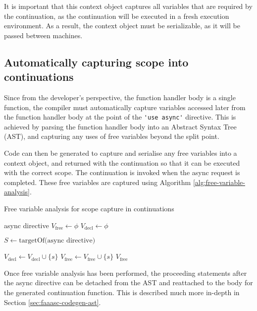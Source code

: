 It is important that this context object captures all variables that are required by the continuation, as the continuation will be executed in a fresh execution environment. As a result, the context object must be serializable, as it will be passed between machines.

\subsection{Automatically capturing scope into continuations}
Since from the developer's perspective, the function handler body is a single function, the \faaasc{} compiler must automatically capture variables accessed later from the function handler body at the point of the \verb|'use async'| directive. This is achieved by parsing the function handler body into an Abstract Syntax Tree (AST), and capturing any uses of free variables beyond the split point.

Code can then be generated to capture and serialise any free variables into a context object, and returned with the continuation so that it can be executed with the correct scope. The continuation is invoked when the async request is completed. These free variables are captured using Algorithm \ref{alg:free-variable-analysis}.

\begin{algorithm}
\caption{Free variable analysis for scope capture in continuations}
\label{alg:free-variable-analysis}
\begin{algorithmic}[1]
\Require async directive
\State $V_\mathrm{free} \gets \phi$
\State $V_\mathrm{decl} \gets \phi$

\State $S \gets \textrm{targetOf(async directive)}$

        \State $V_\mathrm{decl} \gets V_\mathrm{decl} \cup \{s\}$
            \State $V_\mathrm{free} \gets V_\mathrm{free} \cup \{s\}$
        \EndIf
    \EndIf
\EndFor
\Ensure $V_\mathrm{free}$
\end{algorithmic}
\end{algorithm}

Once free variable analysis has been performed, the proceeding statements after the async directive can be detached from the AST and reattached to the body for the generated continuation function. This is described much more in-depth in Section \ref{sec:faaasc-codegen-ast}.

